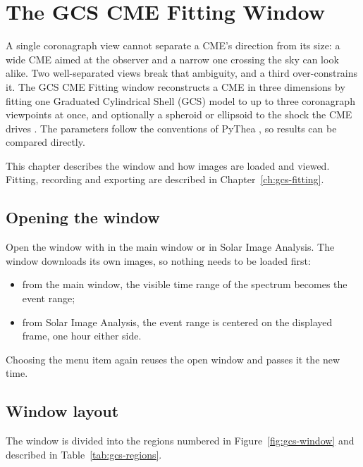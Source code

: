 \chapter{The GCS CME Fitting Window}
\label{ch:gcs-window}

A single coronagraph view cannot separate a CME's direction from its size: a wide CME aimed
at the observer and a narrow one crossing the sky can look alike. Two well-separated views
break that ambiguity, and a third over-constrains it. The GCS CME Fitting window reconstructs
a CME in three dimensions by fitting one Graduated Cylindrical Shell (GCS) model
\parencite{thernisien2006,thernisien2011} to up to three coronagraph viewpoints at once, and
optionally a spheroid or ellipsoid to the shock the CME drives
\parencite{kouloumvakos2019,kwon2014}. The parameters follow the conventions of PyThea
\parencite{kouloumvakos2022}, so results can be compared directly.

This chapter describes the window and how images are loaded and viewed. Fitting, recording
and exporting are described in Chapter~\ref{ch:gcs-fitting}.

\section{Opening the window}

Open the window with  in the main window or in Solar Image
Analysis. The window downloads its own images, so nothing needs to be loaded first:
\begin{itemize}
  \item from the main window, the visible time range of the spectrum becomes the event range;
  \item from Solar Image Analysis, the event range is centered on the displayed frame, one hour
    either side.
\end{itemize}
Choosing the menu item again reuses the open window and passes it the new time.

\section{Window layout}

The window is divided into the regions numbered in Figure~\ref{fig:gcs-window} and described
in Table~\ref{tab:gcs-regions}.

